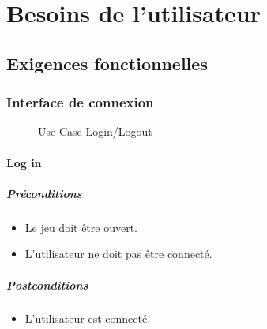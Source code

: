 \documentclass[a4paper,11pt]{report}
\begin{document}
\newpage
\chapter{Besoins de l'utilisateur}
\section{Exigences fonctionnelles}
\subsection{Interface de connexion}
\begin{figure}[ht]
    \caption{Use Case Login/Logout}
\end{figure}
\newpage
\subsubsection{Log in}
\paragraph{Préconditions}
\begin{itemize}
 \item Le jeu doit être ouvert.
 \item L'utilisateur ne doit pas être connecté.
\end{itemize}
\paragraph{Postconditions}
\begin{itemize}
 \item L'utilisateur est connecté.
\end{itemize}
\end{document}
